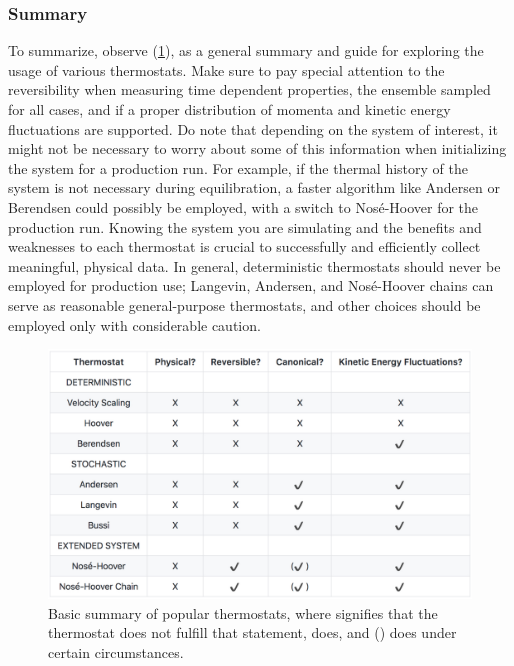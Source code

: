 \documentclass[9pt,bestpractices]{livecoms}
\begin{document}
\subsubsection{Summary}
To summarize, observe (\ref{tstat_summary}), as a general summary and guide for exploring the usage of various thermostats.
Make sure to pay special attention to the reversibility when measuring time dependent properties, the ensemble sampled for all cases, and if a proper distribution of momenta and kinetic energy fluctuations are supported.
Do note that depending on the system of interest, it might not be necessary to worry about some of this information when initializing the system for a production run.
For example, if the thermal history of the system is not necessary during equilibration, a faster algorithm like Andersen or Berendsen could possibly be employed, with a switch to Nos\'{e}-Hoover for the production run.
Knowing the system you are simulating and the benefits and weaknesses to each thermostat is crucial to successfully and efficiently collect meaningful, physical data.
In general, deterministic thermostats should never be employed for production use; Langevin, Andersen, and Nos\'{e}-Hoover chains can serve as reasonable general-purpose thermostats, and other choices should be employed only with considerable caution.

\begin{figure}[h]
\centering
\includegraphics[width=\linewidth]{thermostat_summary.pdf}
    \caption{Basic summary of popular thermostats, where  signifies
    that the thermostat does not fulfill that statement,  does, and
    () does under certain circumstances.}
\label{tstat_summary}
\end{figure}
\end{document}
